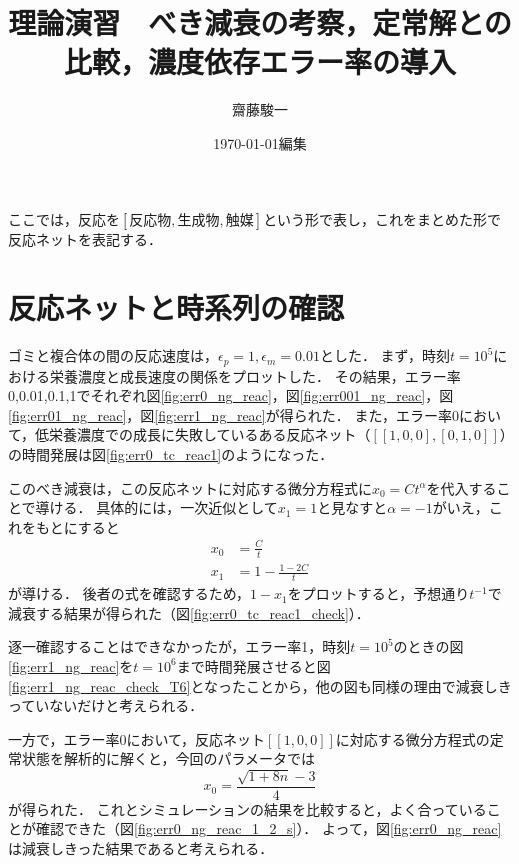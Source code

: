 \documentclass[a4paper,11pt]{jsarticle}
\begin{document}
\title{理論演習　べき減衰の考察，定常解との比較，濃度依存エラー率の導入}
\author{齋藤駿一}
\date{\today 編集}
\maketitle

ここでは，反応を$[\text{反応物}, \text{生成物}, \text{触媒}]$という形で表し，これをまとめた形で反応ネットを表記する．

\section{反応ネットと時系列の確認}
ゴミと複合体の間の反応速度は，$\epsilon_p = 1, \epsilon_m=0.01$とした．
まず，時刻$t=10^5$における栄養濃度と成長速度の関係をプロットした．
その結果，エラー率0,0.01,0.1,1でそれぞれ図\ref{fig:err0_ng_reac}，図\ref{fig:err001_ng_reac}，図\ref{fig:err01_ng_reac}，図\ref{fig:err1_ng_reac}が得られた．
また，エラー率0において，低栄養濃度での成長に失敗しているある反応ネット（$[[1,0,0], [0,1,0]]$）の時間発展は図\ref{fig:err0_tc_reac1}のようになった．

このべき減衰は，この反応ネットに対応する微分方程式に$x_0=Ct^\alpha$を代入することで導ける．
具体的には，一次近似として$x_1 = 1$と見なすと$\alpha = -1$がいえ，これをもとにすると
\begin{align}
  x_0 &= \frac{C}{t} \\
  x_1 &= 1 - \frac{1-2C}{t}
\end{align}
が導ける．
後者の式を確認するため，$1-x_1$をプロットすると，予想通り$t^{-1}$で減衰する結果が得られた（図\ref{fig:err0_tc_reac1_check}）．

逐一確認することはできなかったが，エラー率1，時刻$t=10^5$のときの図\ref{fig:err1_ng_reac}を$t=10^6$まで時間発展させると図\ref{fig:err1_ng_reac_check_T6}となったことから，他の図も同様の理由で減衰しきっていないだけと考えられる．

一方で，エラー率0において，反応ネット$[[1,0,0]]$に対応する微分方程式の定常状態を解析的に解くと，今回のパラメータでは
\begin{equation}
  x_0 = \frac{\sqrt{1+8n} - 3}{4}
\end{equation}
が得られた．
これとシミュレーションの結果を比較すると，よく合っていることが確認できた（図\ref{fig:err0_ng_reac_1_2_s}）．
よって，図\ref{fig:err0_ng_reac}は減衰しきった結果であると考えられる．
\end{document}
